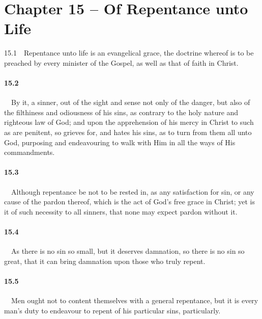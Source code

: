 \section{Chapter 15 -- Of Repentance unto Life} 15.1\ \ Repentance unto life is an evangelical grace, the doctrine whereof is to be preached by every minister of the Gospel, as well as that of faith in Christ.   
\bigskip
\paragraph{15.2}\ \ By it, a sinner, out of the sight and sense not only of the danger, but also of the filthiness and odiousness of his sins, as contrary to the holy nature and righteous law of God; and upon the apprehension of his mercy in Christ to such as are penitent, so grieves for, and hates his sins, as to turn from them all unto God, purposing and endeavouring to walk with Him in all the ways of His commandments.   
\bigskip
\paragraph{15.3}\ \ Although repentance be not to be rested in, as any satisfaction for sin, or any cause of the pardon thereof, which is the act of God's free grace in Christ; yet is it of such necessity to all sinners, that none may expect pardon without it.   
\bigskip
\paragraph{15.4}\ \ As there is no sin so small, but it deserves damnation, so there is no sin so great, that it can bring damnation upon those who truly repent.   
\bigskip
\paragraph{15.5}\ \ Men ought not to content themselves with a general repentance, but it is every man's duty to endeavour to repent of his particular sins, particularly.   
\bigskip
